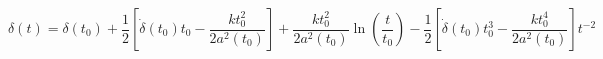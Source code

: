 \begin{equation}\label{deltageneral3}
\delta(t)=\delta(t_0)+\frac{1}{2}[\dot{\delta}(t_0)t_0-\frac{kt_0^2}{2a^2(t_0)}]
+\frac{kt_0^2}{2a^2(t_0)}\ln(\frac{t}{t_0})-\frac{1}{2}[\dot{\delta}(t_0)t_0^3-\frac{kt_0^4}{2a^2(t_0)}]t^{-2}
\end{equation}

